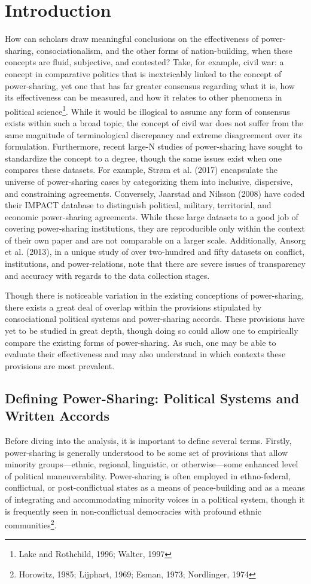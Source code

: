 \documentclass[12pt]{article}
\begin{document}
\section{Introduction}
How can scholars draw meaningful conclusions on the effectiveness of power-sharing, consociationalism, and the other forms of nation-building, when these concepts are fluid, subjective, and contested? Take, for example, civil war: a concept in comparative politics that is inextricably linked to the concept of power-sharing, yet one that has far greater consensus regarding what it is, how its effectiveness can be measured, and how it relates to other phenomena in political science\footnote{Lake and Rothchild, 1996; Walter, 1997}. While it would be illogical to assume any form of consensus exists within such a broad topic, the concept of civil war does not suffer from the same magnitude of terminological discrepancy and extreme disagreement over its formulation. Furthermore, recent large-N studies of power-sharing have sought to standardize the concept to a degree, though the same issues exist when one compares these datasets. For example, Strøm et al. (2017) encapsulate the universe of power-sharing cases by categorizing them into inclusive, dispersive, and constraining agreements. Conversely, Jaarstad and Nilsson (2008) have coded their IMPACT database to distinguish political, military, territorial, and economic power-sharing agreements. While these large datasets to a good job of covering power-sharing institutions, they are reproducible only within the context of their own paper and are not comparable on a larger scale. Additionally, Ansorg et al. (2013), in a unique study of over two-hundred and fifty datasets on conflict, institutions, and power-relations, note that there are severe issues of transparency and accuracy with regards to the data collection stages.

Though there is noticeable variation in the existing conceptions of power-sharing, there exists a great deal of overlap within the provisions stipulated by consociational political systems and power-sharing accords. These provisions have yet to be studied in great depth, though doing so could allow one to empirically compare the existing forms of power-sharing. As such, one may be able to evaluate their effectiveness and may also understand in which contexts these provisions are most prevalent. 

\subsection{Defining Power-Sharing: Political Systems and Written Accords} 
Before diving into the analysis, it is important to define several terms. Firstly, power-sharing is generally understood to be some set of provisions that allow minority groups—ethnic, regional, linguistic, or otherwise—some enhanced level of political maneuverability. Power-sharing is often employed in ethno-federal, conflictual, or post-conflictual states as a means of peace-building and as a means of integrating and accommodating minority voices in a political system, though it is frequently seen in non-conflictual democracies with profound ethnic communities\footnote{Horowitz, 1985; Lijphart, 1969; Esman, 1973; Nordlinger, 1974}.
\end{document}
